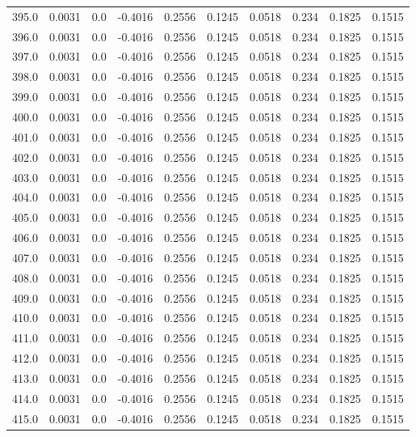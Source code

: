 \begin{longtable}{lrrrrrrrrr}
395.0 & 0.0031 & 0.0 & -0.4016 & 0.2556 & 0.1245 & 0.0518 & 0.234 & 0.1825 & 0.1515 \\
396.0 & 0.0031 & 0.0 & -0.4016 & 0.2556 & 0.1245 & 0.0518 & 0.234 & 0.1825 & 0.1515 \\
397.0 & 0.0031 & 0.0 & -0.4016 & 0.2556 & 0.1245 & 0.0518 & 0.234 & 0.1825 & 0.1515 \\
398.0 & 0.0031 & 0.0 & -0.4016 & 0.2556 & 0.1245 & 0.0518 & 0.234 & 0.1825 & 0.1515 \\
399.0 & 0.0031 & 0.0 & -0.4016 & 0.2556 & 0.1245 & 0.0518 & 0.234 & 0.1825 & 0.1515 \\
400.0 & 0.0031 & 0.0 & -0.4016 & 0.2556 & 0.1245 & 0.0518 & 0.234 & 0.1825 & 0.1515 \\
401.0 & 0.0031 & 0.0 & -0.4016 & 0.2556 & 0.1245 & 0.0518 & 0.234 & 0.1825 & 0.1515 \\
402.0 & 0.0031 & 0.0 & -0.4016 & 0.2556 & 0.1245 & 0.0518 & 0.234 & 0.1825 & 0.1515 \\
403.0 & 0.0031 & 0.0 & -0.4016 & 0.2556 & 0.1245 & 0.0518 & 0.234 & 0.1825 & 0.1515 \\
404.0 & 0.0031 & 0.0 & -0.4016 & 0.2556 & 0.1245 & 0.0518 & 0.234 & 0.1825 & 0.1515 \\
405.0 & 0.0031 & 0.0 & -0.4016 & 0.2556 & 0.1245 & 0.0518 & 0.234 & 0.1825 & 0.1515 \\
406.0 & 0.0031 & 0.0 & -0.4016 & 0.2556 & 0.1245 & 0.0518 & 0.234 & 0.1825 & 0.1515 \\
407.0 & 0.0031 & 0.0 & -0.4016 & 0.2556 & 0.1245 & 0.0518 & 0.234 & 0.1825 & 0.1515 \\
408.0 & 0.0031 & 0.0 & -0.4016 & 0.2556 & 0.1245 & 0.0518 & 0.234 & 0.1825 & 0.1515 \\
409.0 & 0.0031 & 0.0 & -0.4016 & 0.2556 & 0.1245 & 0.0518 & 0.234 & 0.1825 & 0.1515 \\
410.0 & 0.0031 & 0.0 & -0.4016 & 0.2556 & 0.1245 & 0.0518 & 0.234 & 0.1825 & 0.1515 \\
411.0 & 0.0031 & 0.0 & -0.4016 & 0.2556 & 0.1245 & 0.0518 & 0.234 & 0.1825 & 0.1515 \\
412.0 & 0.0031 & 0.0 & -0.4016 & 0.2556 & 0.1245 & 0.0518 & 0.234 & 0.1825 & 0.1515 \\
413.0 & 0.0031 & 0.0 & -0.4016 & 0.2556 & 0.1245 & 0.0518 & 0.234 & 0.1825 & 0.1515 \\
414.0 & 0.0031 & 0.0 & -0.4016 & 0.2556 & 0.1245 & 0.0518 & 0.234 & 0.1825 & 0.1515 \\
415.0 & 0.0031 & 0.0 & -0.4016 & 0.2556 & 0.1245 & 0.0518 & 0.234 & 0.1825 & 0.1515 \\

\end{longtable}
